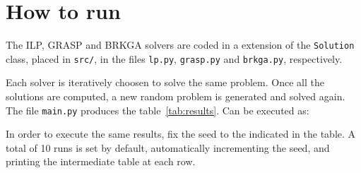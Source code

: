 \documentclass[12pt,a4paper]{article}
\begin{document}

\section{How to run}

The ILP, GRASP and BRKGA solvers are coded in a extension of the 
\texttt{Solution} class, placed in \texttt{src/}, in the files \texttt{lp.py}, 
\texttt{grasp.py} and \texttt{brkga.py}, respectively.

Each solver is iteratively choosen to solve the same problem. Once all the 
solutions are computed, a new random problem is generated and solved again. The 
file \texttt{main.py} produces the table~\ref{tab:results}. Can be executed as:
%
\begin{textcode}
\end{textcode}
%
In order to execute the same results, fix the seed to the indicated in the 
table. A total of 10 runs is set by default, automatically incrementing the 
seed, and printing the intermediate table at each row.
\end{document}
